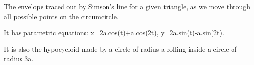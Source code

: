 The envelope traced out by Simson's line for a given triangle, as we
move through all possible points on the circumcircle.
\par
It has parametric equations: x=2a.cos(t)+a.cos(2t), y=2a.sin(t)-a.sin(2t).
\par
It is also the hypocycloid made by a circle of radius a rolling inside a 
circle of radius 3a.